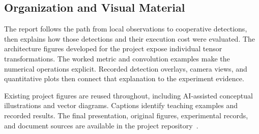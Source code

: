 \subsection{Organization and Visual Material}
The report follows the path from local observations to cooperative
detections, then explains how those detections and their execution cost
were evaluated. The architecture figures developed for the project expose
individual tensor transformations. The worked metric and convolution
examples make the numerical operations explicit. Recorded detection
overlays, camera views, and quantitative plots then connect that explanation
to the experiment evidence.

Existing project figures are reused throughout, including AI-assisted
conceptual illustrations and vector diagrams. Captions identify teaching
examples and recorded results. The final presentation, original figures,
experimental records, and document sources are available in the project
repository~\cite{mo809project}.
